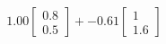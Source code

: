 \documentclass[preview]{standalone}
\begin{document}
\begin{align*}
1.00 \begin{bmatrix} 0.8 \\ 0.5 \end{bmatrix} + -0.61 \begin{bmatrix} 1 \\ 1.6 \end{bmatrix}
\end{align*}
\end{document}
